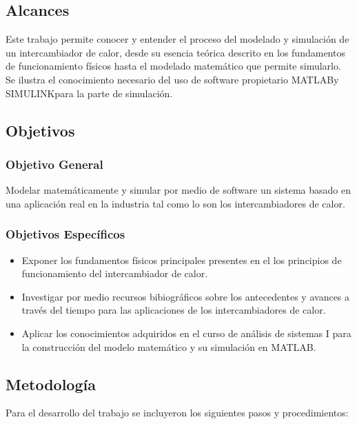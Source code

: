 \documentclass[12pt,letterpaper]{article}     %
\begin{document}
\subsection{Alcances}
Este trabajo permite conocer y entender el proceso del modelado y simulación de un intercambiador de calor, desde su esencia teórica descrito en los fundamentos de funcionamiento físicos hasta el modelado matemático que permite simularlo. Se ilustra el conocimiento necesario del uso de software propietario MATLAB\circledR\space  y SIMULINK\circledR\space para la parte de simulación.
\newpage
\newpage
\subsection{Objetivos}
\subsubsection{Objetivo General}
Modelar matemáticamente y simular por medio de software un sistema basado en una aplicación real en la industria tal como lo son los intercambiadores de calor.

\subsubsection{Objetivos Específicos}
\begin{itemize}
\item Exponer los fundamentos físicos principales presentes en el los principios de funcionamiento del intercambiador de calor.
\item Investigar por medio recursos bibiográficos sobre los antecedentes y avances a través del tiempo para las aplicaciones de los intercambiadores de calor.
\end{itemize}
\begin{itemize}
\item Aplicar los conocimientos adquiridos en el curso de análisis de sistemas I para la construcción del modelo matemático y su simulación en MATLAB.
\end{itemize}

\subsection{Metodología}
Para el desarrollo del trabajo se incluyeron  los siguientes pasos y procedimientos:
\end{document}
